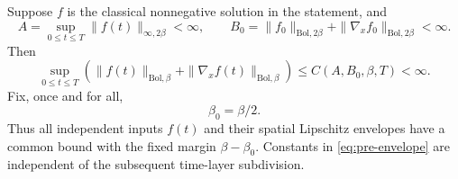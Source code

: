 \begin{proposition}\label{pre:envelopes}
Suppose $f$ is the classical nonnegative solution in the statement, and
\[
 A=\sup_{0\leq t\leq T}\|f(t)\|_{\infty,2\beta}<\infty,\qquad
 B_0=\|f_0\|_{\mathrm{Bol},2\beta}
               +\|\nabla_xf_0\|_{\mathrm{Bol},2\beta}<\infty.
\]
Then
\begin{equation}\label{eq:pre-envelope}
 \sup_{0\leq t\leq T}
 \left(\|f(t)\|_{\mathrm{Bol},\beta}
       +\|\nabla_xf(t)\|_{\mathrm{Bol},\beta}\right)
       \leq C(A,B_0,\beta,T)<\infty.
\end{equation}
Fix, once and for all,
\begin{equation}\label{eq:pre-beta0}
 \beta_0=\beta/2.
\end{equation}
Thus all independent inputs $f(t)$ and their spatial Lipschitz
envelopes have a common bound with the fixed margin
$\beta-\beta_0$. Constants in \eqref{eq:pre-envelope} are independent
of the subsequent time-layer subdivision.
\end{proposition}

